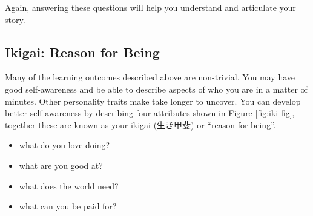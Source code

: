 \documentclass[
]{book}
\providecommand{\tightlist}{%
  \setlength{\itemsep}{0pt}\setlength{\parskip}{0pt}}
\begin{document}
Again, answering these questions will help you understand and articulate your story.

\hypertarget{no42}{%
\subsection{Ikigai: Reason for Being}\label{no42}}

Many of the learning outcomes described above are non-trivial. You may have good self-awareness and be able to describe aspects of who you are in a matter of minutes. Other personality traits make take longer to uncover. You can develop better self-awareness by describing four attributes shown in Figure \ref{fig:iki-fig}, together these are known as your \href{https://en.wikipedia.org/wiki/Ikigai}{ikigai (生き甲斐)} or ``reason for being''.

\begin{itemize}
\tightlist
\item
  what do you love doing?
\item
  what are you good at?
\item
  what does the world need?
\item
  what can you be paid for?
\end{itemize}
\end{document}
